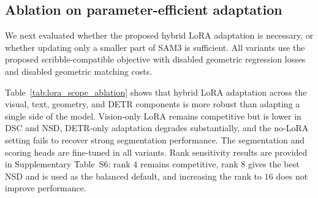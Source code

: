 \documentclass[preprint,12pt]{elsarticle}
\begin{document}
\FloatBarrier

\subsection{Ablation on parameter-efficient adaptation}
\label{sec:lora_ablation}

We next evaluated whether the proposed hybrid LoRA adaptation is necessary, or whether updating only a smaller part of SAM3 is sufficient. All variants use the proposed scribble-compatible objective with disabled geometric regression losses and disabled geometric matching costs.

\begin{table}[!htbp]
\centering
\caption{Ablation study of LoRA adaptation scope. DSC, IoU, and NSD are macro-averaged over ACDC, BTCV\_cervix, and PROMISE12 and reported as percentages; HD95 is reported in millimeters. All variants use rank $8$ and alpha $16$ when LoRA modules are present.}
\label{tab:lora_scope_ablation}
\setlength{\tabcolsep}{5pt}
\end{table}

Table~\ref{tab:lora_scope_ablation} shows that hybrid LoRA adaptation across the visual, text, geometry, and DETR components is more robust than adapting a single side of the model. Vision-only LoRA remains competitive but is lower in DSC and NSD, DETR-only adaptation degrades substantially, and the no-LoRA setting fails to recover strong segmentation performance. The segmentation and scoring heads are fine-tuned in all variants. Rank sensitivity results are provided in Supplementary Table~S6: rank $4$ remains competitive, rank $8$ gives the best NSD and is used as the balanced default, and increasing the rank to $16$ does not improve performance.
\end{document}

